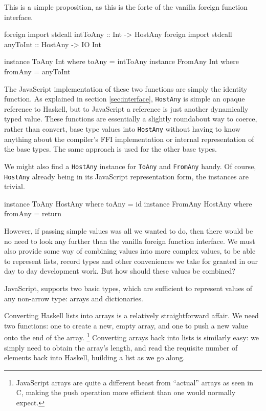 \documentclass[preprint]{sigplanconf}
\begin{document}
This is a simple proposition, as this is the forte of the vanilla foreign
function interface.

\begin{code}
foreign import stdcall intToAny :: Int -> HostAny
foreign import stdcall anyToInt :: HostAny -> IO Int

instance ToAny   Int where toAny   = intToAny
instance FromAny Int where fromAny = anyToInt
\end{code}

The JavaScript implementation of these two functions are simply the identity
function. As explained in section \ref{sec:interface}, \lstinline!HostAny! is
simple an opaque reference to Haskell, but to JavaScript a reference is just
another dynamically typed value. These functions are essentially a slightly
roundabout way to coerce, rather than convert, base type values into
\lstinline!HostAny! without having to know anything about the compiler's FFI
implementation or internal representation of the base types.
The same approach is used for the other base types.

We might also find a \lstinline!HostAny! instance for \lstinline!ToAny!
and \lstinline!FromAny! handy. Of course, \lstinline!HostAny! already being
in its JavaScript representation form, the instances are trivial.

\begin{code}
instance ToAny   HostAny where toAny   = id
instance FromAny HostAny where fromAny = return
\end{code}

However, if passing simple values was all we wanted to do, then there would be
no need to look any further than the vanilla foreign function interface.
We must also provide some way of combining values into more complex values,
to be able to represent lists, record types and other conveniences we take for
granted in our day to day development work.
But how should these values be combined?

JavaScript, supports two basic types, which are
sufficient to represent values of any non-arrow type: arrays and dictionaries.

Converting Haskell lists into arrays is a relatively straightforward affair.
We need two functions: one to create a new, empty array, and one to push a
new value onto the end of the array.%
\footnote{JavaScript arrays are quite a different beast from ``actual'' arrays
  as seen in C, making the push operation more efficient than one would normally
  expect.
}
Converting arrays back into lists is similarly easy: we simply need to obtain
the array's length, and read the requisite number of elements back into
Haskell, building a list as we go along.
\end{document}
